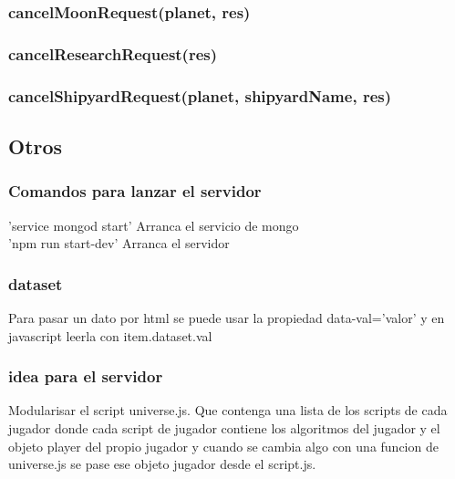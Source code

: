 \documentclass{article}
\begin{document}
        \subsubsection{cancelMoonRequest(planet, res)}
        \subsubsection{cancelResearchRequest(res)}
        \subsubsection{cancelShipyardRequest(planet, shipyardName, res)}
    \subsection{Otros}
        \subsubsection{Comandos para lanzar el servidor}
            'service mongod start' Arranca el servicio de mongo\\
            'npm run start-dev' Arranca el servidor
        \subsubsection{dataset}
          Para pasar un dato por html se puede usar la propiedad data-val='valor' y en javascript leerla con item.dataset.val
        \subsubsection{idea para el servidor}
          Modularisar el script universe.js. Que contenga una lista de los scripts de cada jugador donde cada script de jugador contiene los algoritmos del jugador y el objeto player del propio jugador y cuando se cambia algo con una funcion de universe.js se pase ese objeto jugador desde el script.js.
\end{document}
